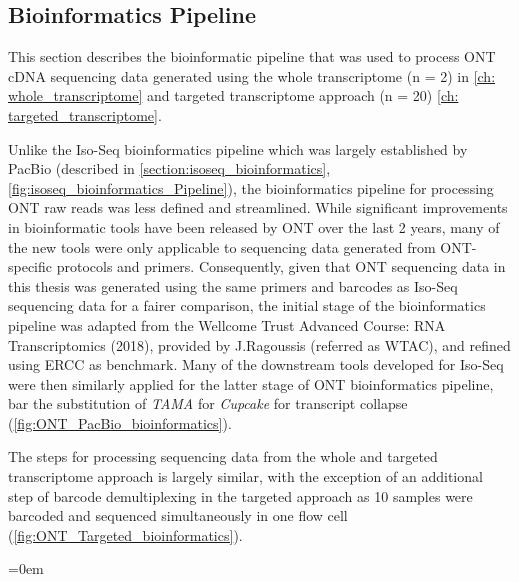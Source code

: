  

\clearpage
\subsection{Bioinformatics Pipeline}
\label{section:ont_bioinformatics}
This section describes the bioinformatic pipeline that was used to process ONT cDNA sequencing data generated using the whole transcriptome (n = 2) in \cref{ch: whole_transcriptome} and targeted transcriptome approach (n = 20) \cref{ch: targeted_transcriptome}. 

Unlike the Iso-Seq bioinformatics pipeline which was largely established by PacBio (described in \cref{section:isoseq_bioinformatics}, \cref{fig:isoseq_bioinformatics_Pipeline}), the bioinformatics pipeline for processing ONT raw reads was less defined and streamlined. While significant improvements in bioinformatic tools have been released by ONT over the last 2 years, many of the new tools were only applicable to sequencing data generated from ONT-specific protocols and primers. Consequently, given that ONT sequencing data in this thesis was generated using the same primers and barcodes as Iso-Seq sequencing data for a fairer comparison, the initial stage of the bioinformatics pipeline was adapted from the Wellcome Trust Advanced Course: RNA Transcriptomics (2018), provided by J.Ragoussis (referred as WTAC), and refined using ERCC as benchmark. Many of the downstream tools developed for Iso-Seq were then similarly applied for the latter stage of ONT bioinformatics pipeline, bar the substitution of \textit{TAMA} for \textit{Cupcake} for transcript collapse (\cref{fig:ONT_PacBio_bioinformatics}). 

The steps for processing sequencing data from the whole and targeted transcriptome approach is largely similar, with the exception of an additional step of barcode demultiplexing in the targeted approach as 10 samples were barcoded and sequenced simultaneously in one flow cell (\cref{fig:ONT_Targeted_bioinformatics}). 

\begingroup
\parindent=0em
\localtableofcontents 
\endgroup

